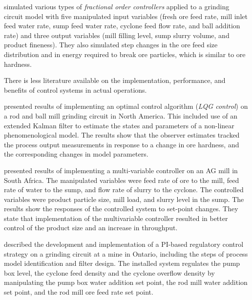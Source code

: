 \cite{aguila-camacho_control_2017} simulated various types of \textit{fractional order controllers} applied to a grinding circuit model with five manipulated input variables (fresh ore feed rate, mill inlet feed water rate, sump feed water rate, cyclone feed flow rate, and ball addition rate) and three output variables (mill filling level, sump slurry volume, and product fineness). They also simulated step changes in the ore feed size distribution and in energy required to break ore particles, which is similar to ore hardness.

There is less literature available on the implementation, performance, and benefits of control systems in actual operations.

\cite{herbst_optimal_1988} presented results of implementing an optimal control algorithm (\textit{LQG control}) on a rod and ball mill grinding circuit in North America. This included use of an extended Kalman filter to estimate the states and parameters of a non-linear phenomenological model. The results show that the observer estimates tracked the process output measurements in response to a change in ore hardness, and the corresponding changes in model parameters.

\cite{hulbert_multivariable_1990} presented results of implementing a multi-variable controller on an AG mill in South Africa. The manipulated variables were feed rate of ore to the mill, feed rate of water to the sump, and flow rate of slurry to the cyclone. The controlled variables were product particle size, mill load, and slurry level in the sump. The results show the responses of the controlled system to set-point changes. They state that implementation of the multivariable controller resulted in better control of the product size and an increase in throughput.

\cite{desbiens_distributed_1997} described the development and implementation of a PI-based regulatory control strategy on a grinding circuit at a mine in Ontario, including the steps of process model identification and filter design. The installed system regulates the pump box level, the cyclone feed density and the cyclone overflow density by manipulating the pump box water addition set point, the rod mill water addition set point, and the rod mill ore feed rate set point.

